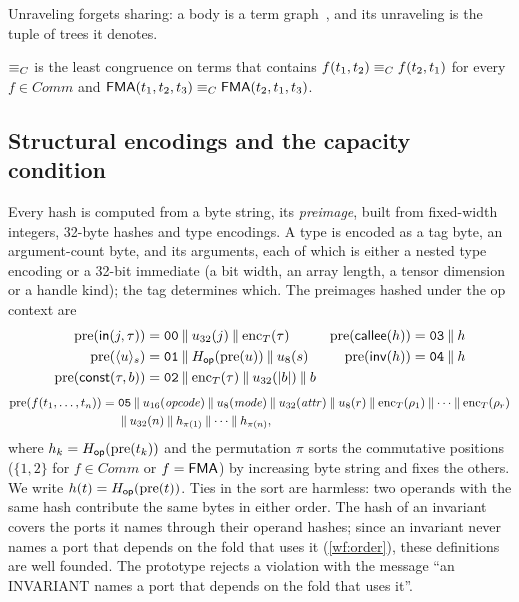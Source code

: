 Unraveling forgets sharing: a body is a term graph~\cite{ariola1996equational}, and its
unraveling is the tuple of trees it denotes.

\begin{definition}\label{def:eqc}
$\equiv_{C}$ is the least congruence on terms that contains $f(t_1,t_2)\equiv_{C} f(t_2,t_1)$ for every
$f\in\mathit{Comm}$ and $\mbox{\textsf{FMA}}(t_1,t_2,t_3)\equiv_{C}\mbox{\textsf{FMA}}(t_2,t_1,t_3)$.
\end{definition}

\subsection{Structural encodings and the capacity condition}

Every hash is computed from a byte string, its \emph{preimage}, built from fixed-width
integers, 32-byte hashes and type encodings. A type is encoded as a tag byte, an argument-count
byte, and its arguments, each of which is either a nested type encoding or a 32-bit immediate
(a bit width, an array length, a tensor dimension or a handle kind); the tag determines which.
The preimages hashed under the op context are
\begin{align*}
\mathrm{pre}(\mathsf{in}(j,\tau)) &= \mathtt{00}\mathbin{\|} u_{32}(j)\mathbin{\|}\mathrm{enc}_T(\tau) &
\mathrm{pre}(\mathsf{callee}(h)) &= \mathtt{03}\mathbin{\|} h \\
\mathrm{pre}(\langle u\rangle_s) &= \mathtt{01}\mathbin{\|}H_{\mathsf{op}}(\mathrm{pre}(u))\mathbin{\|} u_8(s) &
\mathrm{pre}(\mathsf{inv}(h)) &= \mathtt{04}\mathbin{\|} h \\
\mathrm{pre}(\mathsf{const}(\tau,b)) &= \mathtt{02}\mathbin{\|}\mathrm{enc}_T(\tau)\mathbin{\|} u_{32}(|b|)\mathbin{\|} b
\end{align*}
\begin{align*}
\pre(f(t_1,\dots,t_n)) = {}& \mathtt{05}\cat u_{16}(\mathit{opcode})\cat u_8(\mathit{mode})\cat
  u_{32}(\mathit{attr})\cat u_8(r)\cat\enc_T(\rho_1)\cat\dots\cat\enc_T(\rho_r)\\
  & {}\cat u_{32}(n)\cat h_{\pi(1)}\cat\dots\cat h_{\pi(n)},
\end{align*}
where $h_k=H_{\mathsf{op}}(\mathrm{pre}(t_k))$ and the permutation $\pi$ sorts the commutative positions
($\{1,2\}$ for $f\in\mathit{Comm}$ or $f=\mbox{\textsf{FMA}}$) by increasing byte string and fixes the
others. We write $h(t)=H_{\mathsf{op}}(\mathrm{pre}(t))$. Ties in the sort are harmless: two operands with the
same hash contribute the same bytes in either order. The hash of an invariant covers the ports
it names through their operand hashes; since an invariant never names a port that depends on the
fold that uses it (\ref{wf:order}), these definitions are well founded. The prototype rejects a
violation with the message ``an INVARIANT names a port that depends on the fold that uses it''.

